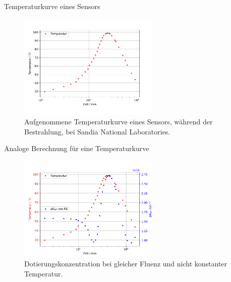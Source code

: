 \documentclass[aspectratio=43, 10pt]{beamer}
\begin{document}
\begin{frame}{Temperaturkurve eines Sensors}
  \begin{figure}
      \includegraphics[width=0.6\textwidth]{images/temperaturkurve.PDF}
  \caption{Aufgenommene Temperaturkurve eines Sensors, während der Bestrahlung, bei Sandia National Laboratories.}
  \end{figure}
\end{frame}


\begin{frame}{Analoge Berechnung für eine Temperaturkurve}
  \begin{figure}
      \includegraphics[width=0.6\textwidth]{images/ohnekorrektur.PDF}
  \caption{Dotierungskonzentration bei gleicher Fluenz und nicht konstanter Temperatur.}
  \end{figure}
\end{frame}
\end{document}
